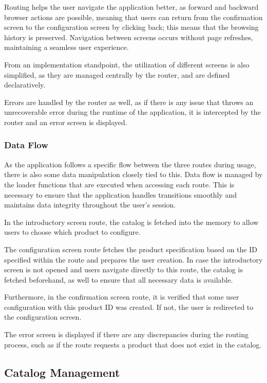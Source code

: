 Routing helps the user navigate the application better, as forward and backward browser actions are possible, meaning that users can return from the confirmation screen to the configuration screen by clicking back; this means that the browsing history is preserved. Navigation between screens occurs without page refreshes, maintaining a seamless user experience.

From an implementation standpoint, the utilization of different screens is also simplified, as they are managed centrally by the router, and are defined declaratively. 

Errors are handled by the router as well, as if there is any issue that throws an unrecoverable error during the runtime of the application, it is intercepted by the router and an error screen is displayed.


\subsubsection{Data Flow}

As the application follows a specific flow between the three routes during usage, there is also some data manipulation closely tied to this. Data flow is managed by the loader functions that are executed when accessing each route. This is necessary to ensure that the application handles transitions smoothly and maintains data integrity throughout the user's session.

In the introductory screen route, the catalog is fetched into the memory to allow users to choose which product to configure.

The configuration screen route fetches the product specification based on the ID specified within the route and prepares the user creation. In case the introductory screen is not opened and users navigate directly to this route, the catalog is fetched beforehand, as well to ensure that all necessary data is available.

Furthermore, in the confirmation screen route, it is verified that some user configuration with this product ID was created. If not, the user is redirected to the configuration screen. 

The error screen is displayed if there are any discrepancies during the routing process, such as if the route requests a product that does not exist in the catalog.


\subsection{Catalog Management} \label{section:catalog-management}

